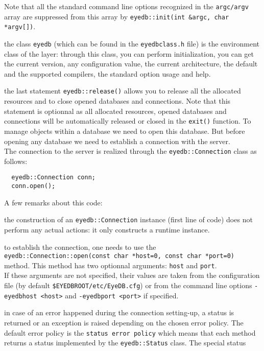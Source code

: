 \normalsize
Note that all the standard command line options recognized in the
\texttt{argc/argv} array are suppressed from this array by
\texttt{eyedb::init(int \&argc, char *argv[])}.
\item the class \texttt{eyedb} (which can be found in the \texttt{eyedbclass.h}
file) is the environment class of the \eyedb layer: through this class,
you can perform initialization, you can get the current \eyedb version,
any configuration value, the current architecture,
the default and the supported compilers, the standard option usage and help.
\item the last statement \texttt{eyedb::release()} allows you to release all
the \eyedb allocated resources and to close opened databases and connections.
Note that this statement is optionnal as all \eyedb allocated resources,
opened databases and connections will be automatically released or closed
in the \texttt{exit()} function.
\ee
{}
To manage objects within a database we need to open this database.
But before opening any database we need to establish a connection with
the \eyedb server.
\\
The connection to the \eyedb server is realized through the
\texttt{eyedb::Connection} class as follows:
\verbsize
\begin{verbatim}
  eyedb::Connection conn;
  conn.open();
\end{verbatim}
\normalsize
A few remarks about this code:
\be
\item the construction of an \texttt{eyedb::Connection} instance (first line of code)
does not perform any actual actions: it only constructs a runtime instance.
\item to establish the connection, one needs to use the
\texttt{eyedb::Connection::open(const char *host=0, const char *port=0)} method.
This method has two optionnal arguments: \texttt{host} and \texttt{port}.
\\
If these arguments are not specified, their values are taken from the
configuration file (by default \texttt{\$EYEDBROOT/etc/EyeDB.cfg}) or
from the command line options \texttt{-eyedbhost <host>} and
\texttt{-eyedbport <port>} if specified.
\item in case of an error happened during the connection setting-up,
a status is returned or an exception is raised depending on the
chosen error policy. The default error policy is the \texttt{status error
policy} which means that each \eyedb method returns a status
implemented by the \texttt{eyedb::Status} class. The special status
